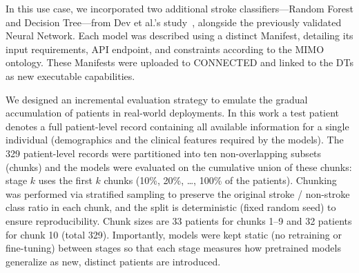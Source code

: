 In this use case, we incorporated two additional stroke classifiers—Random Forest and Decision Tree—from Dev et al.’s study~\cite{dev_predictive_2022}, alongside the previously validated Neural Network. Each model was described using a distinct Manifest, detailing its input requirements, API endpoint, and constraints according to the MIMO ontology. These Manifests were uploaded to CONNECTED and linked to the DTs as new executable capabilities.


We designed an incremental evaluation strategy to emulate the gradual accumulation of patients in real-world deployments. In this work a test patient denotes a full patient-level record containing all available information for a single individual (demographics and the clinical features required by the models). The 329 patient-level records were partitioned into ten non-overlapping subsets (chunks) and the models were evaluated on the cumulative union of these chunks: stage $k$ uses the first $k$ chunks (10\%, 20\%, \dots, 100\% of the patients). Chunking was performed via stratified sampling to preserve the original stroke / non-stroke class ratio in each chunk, and the split is deterministic (fixed random seed) to ensure reproducibility. Chunk sizes are 33 patients for chunks 1–9 and 32 patients for chunk 10 (total 329). Importantly, models were kept static (no retraining or fine-tuning) between stages so that each stage measures how pretrained models generalize as new, distinct patients are introduced.

